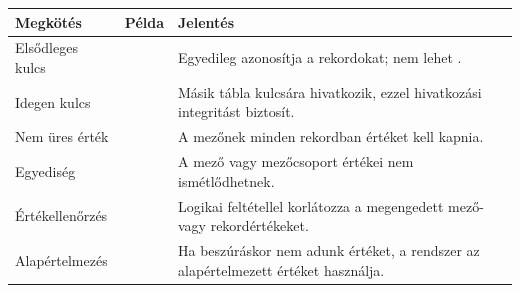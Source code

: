 \begin{tabularx}{\textwidth}{L{33mm}L{37mm}X}
\toprule
\textbf{Megkötés} & \textbf{Példa} & \textbf{Jelentés} \\
\midrule
Elsődleges kulcs &  & Egyedileg azonosítja a rekordokat; nem lehet . \\
Idegen kulcs &  & Másik tábla kulcsára hivatkozik, ezzel hivatkozási integritást biztosít. \\
Nem üres érték &  & A mezőnek minden rekordban értéket kell kapnia. \\
Egyediség &  & A mező vagy mezőcsoport értékei nem ismétlődhetnek. \\
Értékellenőrzés &  & Logikai feltétellel korlátozza a megengedett mező- vagy rekordértékeket. \\
Alapértelmezés &  & Ha beszúráskor nem adunk értéket, a rendszer az alapértelmezett értéket használja. \\
\bottomrule
\end{tabularx}
